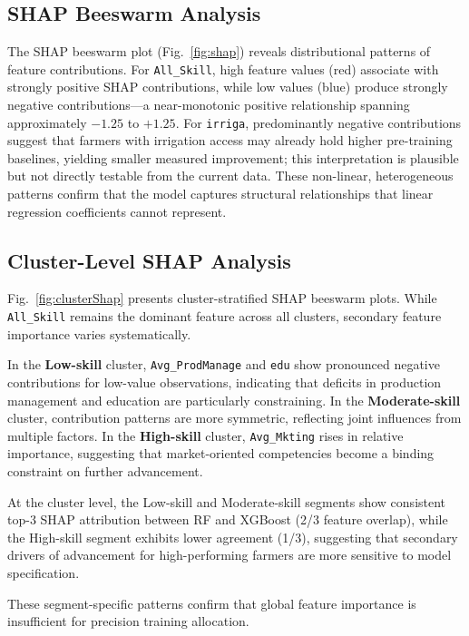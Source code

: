 \documentclass[3p,twocolumn,authoryear]{elsarticle}
\begin{document}
\subsection{SHAP Beeswarm Analysis}

The SHAP beeswarm plot (Fig.~\ref{fig:shap}) reveals distributional
patterns of feature contributions.
For \texttt{All\_Skill}, high feature values (red) associate with
strongly positive SHAP contributions, while low values (blue) produce
strongly negative contributions---a near-monotonic positive relationship
spanning approximately $-1.25$ to $+1.25$.
For \texttt{irriga}, predominantly negative contributions suggest that
farmers with irrigation access may already hold higher pre-training
baselines, yielding smaller measured improvement; this interpretation
is plausible but not directly testable from the current data.
These non-linear, heterogeneous patterns confirm that the model captures
structural relationships that linear regression coefficients cannot
represent.

\subsection{Cluster-Level SHAP Analysis}

Fig.~\ref{fig:clusterShap} presents cluster-stratified SHAP beeswarm
plots.
While \texttt{All\_Skill} remains the dominant feature across all
clusters, secondary feature importance varies systematically.

In the \textbf{Low-skill} cluster, \texttt{Avg\_ProdManage} and
\texttt{edu} show pronounced negative contributions for low-value
observations, indicating that deficits in production management and
education are particularly constraining.
In the \textbf{Moderate-skill} cluster, contribution patterns are more
symmetric, reflecting joint influences from multiple factors.
In the \textbf{High-skill} cluster, \texttt{Avg\_Mkting} rises in
relative importance, suggesting that market-oriented competencies become
a binding constraint on further advancement.

At the cluster level, the Low-skill and Moderate-skill segments show
consistent top-3 SHAP attribution between RF and XGBoost (2/3 feature
overlap), while the High-skill segment exhibits lower agreement (1/3),
suggesting that secondary drivers of advancement for high-performing
farmers are more sensitive to model specification.

These segment-specific patterns confirm that global feature importance
is insufficient for precision training allocation.
\end{document}
